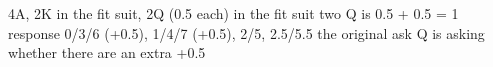4A, 2K in the fit suit, 2Q (0.5 each) in the fit suit
two Q is 0.5 + 0.5 = 1
response 0/3/6 (+0.5), 1/4/7 (+0.5), 2/5, 2.5/5.5
the original ask Q is asking whether there are an extra +0.5